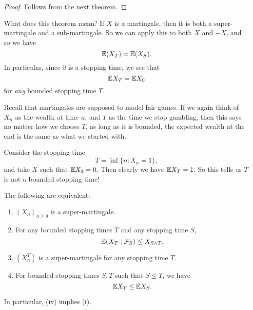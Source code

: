 \documentclass[a4paper]{article}
\begin{document}
\begin{proof}
  Follows from the next theorem.
\end{proof}
What does this theorem mean? If $X$ is a martingale, then it is both a super-martingale and a sub-martingale. So we can apply this to both $X$ and $-X$, and so we have
\[
  \mathbb{E}(X_T) = \mathbb{E}(X_S).
\]
In particular, since $0$ is a stopping time, we see that
\[
  \mathbb{E} X_T = \mathbb{E} X_0
\]
for \emph{any} bounded stopping time $T$.

Recall that martingales are supposed to model fair games. If we again think of $X_n$ as the wealth at time $n$, and $T$ as the time we stop gambling, then this says no matter how we choose $T$, as long as it is bounded, the expected wealth at the end is the same as what we started with.

\begin{eg}
  Consider the stopping time
  \[
    T = \inf \{n : X_n = 1\},
  \]
  and take $X$ such that $\mathbb{E} X_0 = 0$. Then clearly we have $\mathbb{E} X_T = 1$. So this tells us $T$ is not a bounded stopping time!
\end{eg}

\begin{thm}
  The following are equivalent:
  \begin{enumerate}
    \item $(X_n)_{n \geq 0}$ is a super-martingale.
    \item For any bounded stopping times $T$ and any stopping time $S$,
      \[
        \mathbb{E}(X_T \mid \mathcal{F}_S) \leq X_{S \wedge T}.
      \]
    \item $(X_n^T)$ is a super-martingale for any stopping time $T$.
    \item For bounded stopping times $S, T$ such that $S \leq T$, we have
      \[
        \mathbb{E} X_T \leq \mathbb{E} X_S.
      \]
  \end{enumerate}
\end{thm}
In particular, (iv) implies (i).
\end{document}
